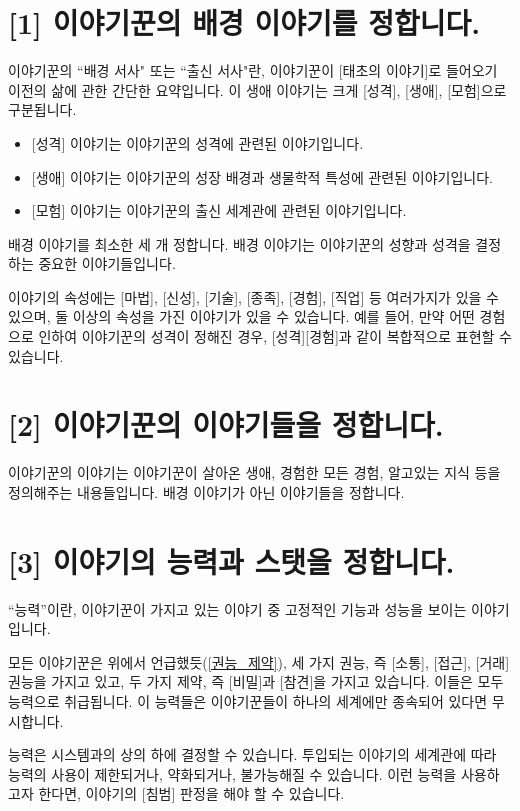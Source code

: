 \documentclass{report}
\begin{document}
	\section*{[1] 이야기꾼의 배경 이야기를 정합니다.}
	
	이야기꾼의 ``배경 서사" 또는 ``출신 서사"란, 이야기꾼이 [태초의 이야기]로 들어오기 이전의 삶에 관한 간단한 요약입니다. 이 생애 이야기는 크게 [성격], [생애], [모험]으로 구분됩니다.
	\begin{itemize}[label={-}]
		\item {}[성격] 이야기는 이야기꾼의 성격에 관련된 이야기입니다.
		\item {}[생애] 이야기는 이야기꾼의 성장 배경과 생물학적 특성에 관련된 이야기입니다.
		\item {}[모험] 이야기는 이야기꾼의 출신 세계관에 관련된 이야기입니다.
	\end{itemize}
	
	배경 이야기를 최소한 세 개 정합니다. 배경 이야기는 이야기꾼의 성향과 성격을 결정하는 중요한 이야기들입니다.
	
	이야기의 속성에는 [마법], [신성], [기술], [종족], [경험], [직업] 등 여러가지가 있을 수 있으며, 둘 이상의 속성을 가진 이야기가 있을 수 있습니다. 예를 들어, 만약 어떤 경험으로 인하여 이야기꾼의 성격이 정해진 경우, [성격][경험]과 같이 복합적으로 표현할 수 있습니다.
	
	\section*{[2] 이야기꾼의 이야기들을 정합니다.}
	이야기꾼의 이야기는 이야기꾼이 살아온 생애, 경험한 모든 경험, 알고있는 지식 등을 정의해주는 내용들입니다. 배경 이야기가 아닌 이야기들을 정합니다.
	
	\section*{[3] 이야기의 능력과 스탯을 정합니다.}
	“능력”이란, 이야기꾼이 가지고 있는 이야기 중 고정적인 기능과 성능을 보이는 이야기입니다.
	
	모든 이야기꾼은 위에서 언급했듯(\ref{권능_제약}), 세 가지 권능, 즉 [소통], [접근], [거래] 권능을 가지고 있고, 두 가지 제약, 즉 [비밀]과 [참견]을 가지고 있습니다. 이들은 모두 능력으로 취급됩니다. 이 능력들은 이야기꾼들이 하나의 세계에만 종속되어 있다면 무시합니다.
	
	능력은 시스템과의 상의 하에 결정할 수 있습니다. 투입되는 이야기의 세계관에 따라 능력의 사용이 제한되거나, 약화되거나, 불가능해질 수 있습니다. 이런 능력을 사용하고자 한다면, 이야기의 [침범] 판정을 해야 할 수 있습니다.
	
\end{document}
